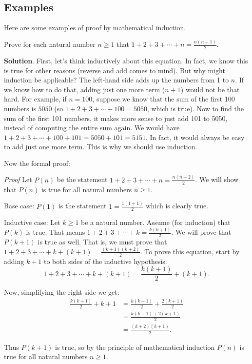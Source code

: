 \documentclass[11pt,]{book}
\makeatletter
\theoremstyle{ptxplainnotitle}
\theoremstyle{ptxplaintitle}
\renewcommand*{\proofname}{Proof}
\renewenvironment{proof}[1][\proofname]{\par
  \pushQED{\qed}%
  \normalfont \topsep6\p@\@plus6\p@\relax
  \trivlist
  \item\relax
    {\itshape
    #1\@addpunct{.}}\hspace\labelsep\ignorespaces
}{%
  \popQED\endtrivlist\@endpefalse
}
\theoremstyle{ptxdefinitionnotitle}
\theoremstyle{ptxdefinitiontitle}
\theoremstyle{ptxdefinitionnotitle}
\theoremstyle{ptxdefinitiontitle}
\theoremstyle{ptxdefinitionnotitle}
\theoremstyle{ptxdefinitiontitle}
\theoremstyle{ptxdefinitiontitlenonumber}
\theoremstyle{ptxdefinitiontitlenonumber}
\numberwithin{equation}{chapter}
\newcommand{\amp}{&}
\makeatother
\begin{document}
\subsection[{Examples}]{Examples}\label{subsec_induction-examples}
\hypertarget{p-546}{}%
Here are some examples of proof by mathematical induction.%
\begin{example}\label{example-25}
\hypertarget{p-547}{}%
Prove for each natural number \(n \ge 1\) that \(1 + 2 + 3 + \cdots + n = \frac{n(n+1)}{2}\).%
\par\smallskip%
\noindent\textbf{Solution}.\hypertarget{solution-75}{}\quad%
\hypertarget{p-548}{}%
First, let's think inductively about this equation. In fact, we know this is true for other reasons (reverse and add comes to mind). But why might induction be applicable? The left-hand side adds up the numbers from 1 to \(n\). If we know how to do that, adding just one more term (\(n+1\)) would not be that hard. For example, if \(n = 100\), suppose we know that the sum of the first 100 numbers is \(5050\) (so \(1 + 2 + 3 + \cdots + 100 = 5050\), which is true). Now to find the sum of the first 101 numbers, it makes more sense to just add 101 to 5050, instead of computing the entire sum again. We would have \(1 + 2 + 3 + \cdots + 100 + 101 = 5050 + 101 = 5151\). In fact, it would always be easy to add just one more term. This is why we should use induction.%
\par
\hypertarget{p-549}{}%
Now the formal proof:%
\begin{proof}\hypertarget{proof-2}{}
\hypertarget{p-550}{}%
Let \(P(n)\) be the statement \(1 + 2 + 3 + \cdots + n = \frac{n(n+2)}{2}\). We will show that \(P(n)\) is true for all natural numbers \(n \ge 1\).%
\par
\hypertarget{p-551}{}%
Base case: \(P(1)\) is the statement \(1 = \frac{1(1+1)}{2}\) which is clearly true.%
\par
\hypertarget{p-552}{}%
Inductive case: Let \(k \ge 1\) be a natural number. Assume (for induction) that \(P(k)\) is true. That means \(1 + 2 + 3 + \cdots + k = \frac{k(k+1)}{2}\). We will prove that \(P(k+1)\) is true as well. That is, we must prove that \(1 + 2 + 3 + \cdots + k + (k+1) = \frac{(k+1)(k+2)}{2}\). To prove this equation, start by adding \(k+1\) to both sides of the inductive hypothesis:%
\begin{equation*}
1 + 2 + 3 + \cdots + k + (k+1) = \frac{k(k+1)}{2} + (k+1).
\end{equation*}
%
\par
\hypertarget{p-553}{}%
Now, simplifying the right side we get:%
\begin{align*}
\frac{k(k+1)}{2} + k+1 \amp = \frac{k(k+1)}{2} + \frac{2(k+1)}{2}\\
\amp = \frac{k(k+1) + 2(k+1)}{2}\\
\amp = \frac{(k+2)(k+1)}{2}.
\end{align*}
%
\par
\hypertarget{p-554}{}%
Thus \(P(k+1)\) is true, so by the principle of mathematical induction \(P(n)\) is true for all natural numbers \(n \ge 1\).%
\end{proof}
\end{example}
\end{document}
